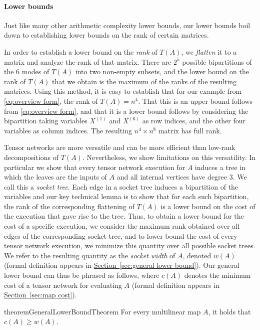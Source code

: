 \documentclass[11pt]{article}
\numberwithin{equation}{section}
\theoremstyle{definition}
\theoremstyle{plain}
\newcommand{\expref}[2]{\hyperref[#2]{#1~\ref{#2}}}
\begin{document}
\paragraph*{Lower bounds}

Just like many other arithmetic complexity lower bounds, our lower bounds
boil down to establishing lower bounds on the rank of certain
matrices.

In order to establish a lower bound on the \emph{rank} of $T(A)$,
we \emph{flatten} it to a matrix and analyze the rank of that
matrix.  There are $2^5$ possible bipartitions of the $6$ modes of
$T(A)$ into two non-empty subsets, and the lower bound on the rank of
$T(A)$ that we obtain is the maximum of the ranks of the
resulting matrices.  Using this method, it is easy to establish that
for our example from \eqref{eq:overview form}, the rank of
$T(A) = n^4$.  That this is an upper bound follows from
\eqref{eq:overview form}, and that it is a lower bound follows by
considering the bipartition taking variables $X^{(1)}$ and
$X^{(6)}$ as row indices, and the other four variables as column indices.
The resulting $n^4 \times n^8$ matrix has full rank.

Tensor networks are more versatile and can be more efficient
than low-rank decompositions of $T(A)$.  Nevertheless, we show
limitations on this versatility.  In particular we show that every
tensor network execution for $A$ induces a tree in which the leaves are the inputs of $A$ and all internal vertices have degree $3$.  We call this a \emph{socket tree}.  Each edge in a socket
tree induces a bipartition of the variables and our key technical
lemma is to show that for each such bipartition, the rank of the
corresponding flattening of $T(A)$ is a lower bound on the
cost of the execution that gave rise to the tree.  Thus, to obtain a lower
bound for the cost of a specific execution, we consider the maximum
rank obtained over all
edges of the corresponding socket tree, and to lower bound the cost of
every tensor network execution, we minimize this quantity over all
possible socket trees.  We refer to the resulting quantity as the
\emph{socket width} of $A$, denoted $w(A)$ (formal definition appears in \expref{Section}{sec:general lower bound}).  Our general lower bound
can thus be phrased as follows, where $c(A)$ denotes the minimum cost of a tensor network for evaluating $A$ (formal definition appears in \expref{Section}{sec:map cost}).

\begin{restatable}{theorem}{GeneralLowerBoundTheorem}
  \label{thm:general lower bound}
  For every multilinear map $A$, it holds that $c(A) \ge w(A)$.
\end{restatable}
\end{document}
